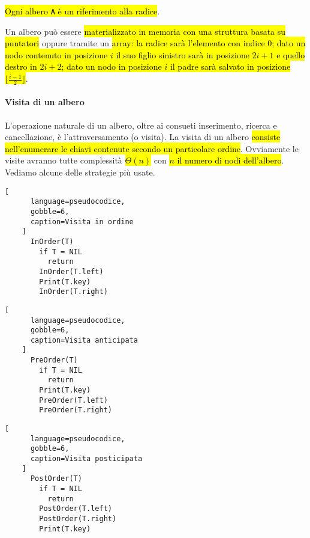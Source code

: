 \documentclass[a4paper,11pt,twoside]{article}
\theoremstyle{plain}
\theoremstyle{definition}
\theoremstyle{remark}
\begin{document}
\hl{Ogni albero \texttt{A} è un riferimento alla radice}.

Un albero può essere \hl{materializzato in memoria con una struttura basata su
puntatori} oppure tramite un \hl{array: la radice sarà l'elemento con indice 0;
dato un nodo contenuto in posizione $i$ il suo figlio sinistro sarà in posizione
$2i+1$ e quello destro in $2i + 2$; dato un nodo in posizione $i$ il padre sarà
salvato in posizione $\lfloor \frac{i-1}{2} \rfloor$}.

\paragraph{Visita di un albero} L'operazione naturale di un albero, oltre ai
consueti inserimento, ricerca e cancellazione, è l'attraversamento (o visita).
La visita di un albero \hl{consiste nell'enumerare le chiavi contenute secondo
un particolare ordine}. Ovviamente le visite avranno tutte complessità
\hl{$\Theta(n)$} con \hl{$n$ il numero di nodi dell'albero}. Vediamo alcune
delle strategie più usate.

\noindent\begin{minipage}{\textwidth}
  \centering
  \begin{minipage}{0.45\textwidth}
    \centering
    \begin{lstlisting}[
      language=pseudocodice,
      gobble=6,
      caption=Visita in ordine
    ]
      InOrder(T)
        if T = NIL
          return
        InOrder(T.left)
        Print(T.key)
        InOrder(T.right)
    \end{lstlisting}
  \end{minipage}
  \begin{minipage}{0.45\textwidth}
    \centering
    \begin{lstlisting}[
      language=pseudocodice,
      gobble=6,
      caption=Visita anticipata
    ]
      PreOrder(T)
        if T = NIL
          return
        Print(T.key)
        PreOrder(T.left)
        PreOrder(T.right)
    \end{lstlisting}
  \end{minipage}
  \begin{minipage}{0.45\textwidth}
    \centering
    \begin{lstlisting}[
      language=pseudocodice,
      gobble=6,
      caption=Visita posticipata
    ]
      PostOrder(T)
        if T = NIL
          return
        PostOrder(T.left)
        PostOrder(T.right)
        Print(T.key)
    \end{lstlisting}
  \end{minipage}
\end{minipage}
\end{document}

